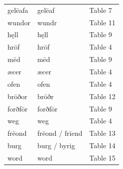 \begin{longtable}{@{}>{\raggedright\arraybackslash}p{48mm}>{\raggedright\arraybackslash}p{48mm}>{\raggedright\arraybackslash}p{22.37mm}@{}}
gelēafa & gelēaf & Table 7 \\
wundor & wundr & Table 11 \\
hęll & hęll & Table 9 \\
hrōf & hrōf & Table 4 \\
mēd & mēd & Table 9 \\
æcer & æcer & Table 4 \\
ofen & ofen & Table 4 \\
brōðor & brōðr & Table 12 \\
forðfōr & forðfōr & Table 9 \\
weg & weg & Table 4 \\
frēond & frēond /\allowbreak{} frīend & Table 13 \\
burg & burg /\allowbreak{} byrig & Table 14 \\
word & word & Table 15 \\
\end{longtable}
\par\addvspace{5pt}
\setlength{\LTleft}{0pt}\setlength{\LTright}{\fill}
